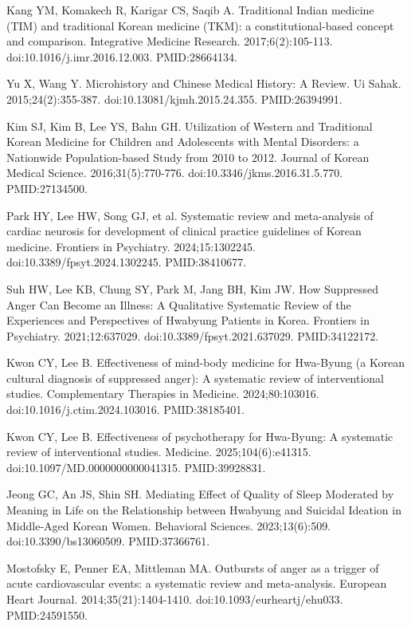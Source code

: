 \documentclass[12pt,oneside]{book}
\newcommand{\reff}[2]{\par\hangindent=7mm\hangafter=1\noindent[#1]\hspace{2mm}#2\par}
\begin{document}
\reff{17}{Kang YM, Komakech R, Karigar CS, Saqib A. Traditional Indian medicine (TIM) and traditional Korean medicine (TKM): a constitutional-based concept and comparison. Integrative Medicine Research. 2017;6(2):105-113. doi:10.1016/j.imr.2016.12.003. PMID:28664134.}

\reff{18}{Yu X, Wang Y. Microhistory and Chinese Medical History: A Review. Ui Sahak. 2015;24(2):355-387. doi:10.13081/kjmh.2015.24.355. PMID:26394991.}

\reff{19}{Kim SJ, Kim B, Lee YS, Bahn GH. Utilization of Western and Traditional Korean Medicine for Children and Adolescents with Mental Disorders: a Nationwide Population-based Study from 2010 to 2012. Journal of Korean Medical Science. 2016;31(5):770-776. doi:10.3346/jkms.2016.31.5.770. PMID:27134500.}

\reff{20}{Park HY, Lee HW, Song GJ, et al. Systematic review and meta-analysis of cardiac neurosis for development of clinical practice guidelines of Korean medicine. Frontiers in Psychiatry. 2024;15:1302245. doi:10.3389/fpsyt.2024.1302245. PMID:38410677.}

\reff{21}{Suh HW, Lee KB, Chung SY, Park M, Jang BH, Kim JW. How Suppressed Anger Can Become an Illness: A Qualitative Systematic Review of the Experiences and Perspectives of Hwabyung Patients in Korea. Frontiers in Psychiatry. 2021;12:637029. doi:10.3389/fpsyt.2021.637029. PMID:34122172.}

\reff{22}{Kwon CY, Lee B. Effectiveness of mind-body medicine for Hwa-Byung (a Korean cultural diagnosis of suppressed anger): A systematic review of interventional studies. Complementary Therapies in Medicine. 2024;80:103016. doi:10.1016/j.ctim.2024.103016. PMID:38185401.}

\reff{23}{Kwon CY, Lee B. Effectiveness of psychotherapy for Hwa-Byung: A systematic review of interventional studies. Medicine. 2025;104(6):e41315. doi:10.1097/MD.0000000000041315. PMID:39928831.}

\reff{24}{Jeong GC, An JS, Shin SH. Mediating Effect of Quality of Sleep Moderated by Meaning in Life on the Relationship between Hwabyung and Suicidal Ideation in Middle-Aged Korean Women. Behavioral Sciences. 2023;13(6):509. doi:10.3390/bs13060509. PMID:37366761.}

\reff{25}{Mostofsky E, Penner EA, Mittleman MA. Outbursts of anger as a trigger of acute cardiovascular events: a systematic review and meta-analysis. European Heart Journal. 2014;35(21):1404-1410. doi:10.1093/eurheartj/ehu033. PMID:24591550.}
\end{document}
